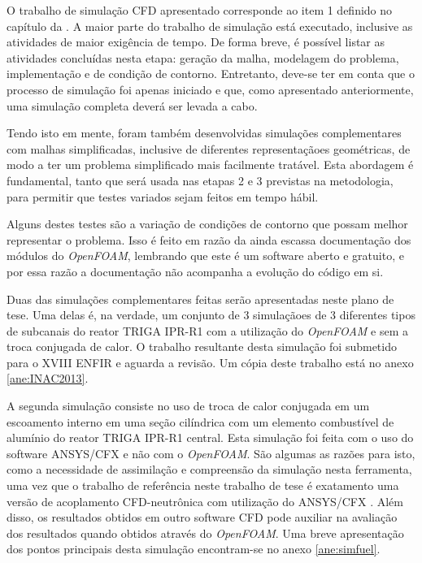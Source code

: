 \documentclass[12pt,openright,twoside,a4paper,english,french,spanish,brazil]{abntex2}
\begin{document}
O trabalho de simulação CFD apresentado corresponde ao item 1 definido no capítulo da .
A maior parte do trabalho de simulação está executado, inclusive as atividades de maior exigência de tempo. De forma 
breve, é possível listar as atividades concluídas nesta etapa: geração da malha, modelagem do problema, implementação 
e de condição de contorno. Entretanto, deve-se ter em conta que o processo de simulação foi apenas iniciado e que, 
como apresentado anteriormente, uma simulação completa deverá ser levada a cabo.

Tendo isto em mente, foram também desenvolvidas simulações complementares com malhas simplificadas, inclusive 
de diferentes representaçãoes geométricas, de modo a ter um problema simplificado mais facilmente tratável. Esta 
abordagem é fundamental, tanto que será usada nas etapas 2 e 3 previstas na metodologia, para permitir que 
testes variados sejam feitos em tempo hábil. 

Alguns destes testes são a variação de condições de contorno que possam melhor representar o problema. Isso é 
feito em razão da ainda escassa documentação dos módulos do \textit{OpenFOAM}, lembrando que este é um software 
aberto e gratuito, e por essa razão a documentação não acompanha a evolução do código em si.

Duas das simulações complementares feitas serão apresentadas neste plano de tese. Uma delas é, na verdade, um 
conjunto de 3 simulaçãoes de 3 diferentes tipos de subcanais do reator TRIGA IPR-R1 com a utilização do \textit{OpenFOAM} e sem a troca 
conjugada de calor. O trabalho resultante desta simulação foi submetido para o XVIII ENFIR e aguarda a revisão. 
Um cópia deste trabalho está no anexo \ref{ane:INAC2013}.

A segunda simulação consiste no uso de troca de calor conjugada em um escoamento interno em uma seção cilíndrica 
com um elemento combustível de alumínio do reator TRIGA IPR-R1 central. Esta simulação foi feita com o uso do 
software ANSYS/CFX e não com o \textit{OpenFOAM}. São algumas as razões para isto, como a necessidade de assimilação 
e compreensão da simulação nesta ferramenta, uma vez que o trabalho de referência neste trabalho de tese é exatamento 
uma versão de acoplamento CFD-neutrônica com utilização do ANSYS/CFX \cite{Monferrer2011a}. Além disso, os resultados 
obtidos em outro software CFD pode auxiliar na avaliação dos resultados quando obtidos através do \textit{OpenFOAM}.
Uma breve apresentação dos pontos principais desta simulação encontram-se no anexo \ref{ane:simfuel}.
\end{document}
